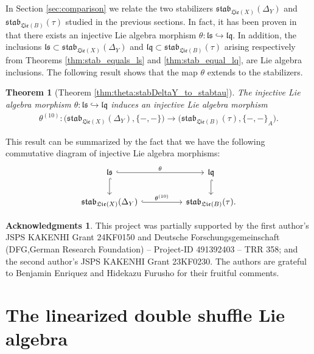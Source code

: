 \documentclass[11pt, a4paper]{amsart}
\newtheorem{thm}{Theorem}
\numberwithin{equation}{section}
\theoremstyle{definition}
\newtheorem*{acknowledgments}{Acknowledgments}
\newcommand{\ls}{\mathfrak{ls}}
\newcommand{\lqq}{\mathfrak{lq}}
\newcommand{\Lie}{\mathfrak{Lie}}
\newcommand{\stab}{\mathfrak{stab}}
\begin{document}
In Section \ref{sec:comparison} we relate the two stabilizers $\stab_{\Lie(X)}(\Delta_Y)$ and $\stab_{\Lie(B)}(\tau)$ studied in the previous sections. In fact, it has been proven in \cite[Theorem 7.10]{Bu25} that there exists an injective Lie algebra morphism $\theta : \ls \hookrightarrow \lqq$. In addition, the inclusions $\ls \subset \stab_{\Lie(X)}(\Delta_Y)$ and $\lqq \subset \stab_{\Lie(B)}(\tau)$ arising respectively from Theorems \ref{thm:stab_equals_ls} and \ref{thm:stab_equal_lq}, are Lie algebra inclusions. The following result shows that the map $\theta$ extends to the stabilizers.
\begin{thm}[Theorem \ref{thm:theta:stabDeltaY_to_stabtau}] The injective Lie algebra morphism $\theta : \ls \hookrightarrow \lqq$ induces an injective Lie algebra morphism
\begin{align*}
\theta^{(10)} : \big(\stab_{\Lie(X)}(\Delta_Y), \{-, -\}\big) \longrightarrow \big(\stab_{\Lie(B)}(\tau), \{-, -\}_A\big).
\end{align*}
\end{thm}
This result can be summarized by the fact that we have the following commutative diagram of injective Lie algebra morphisms:
\[\begin{tikzcd}
    \ls \ar[rr, hook, "\theta"] \ar[d, hook] && \lqq \ar[d, hook] \\
    \stab_{\Lie(X)}(\Delta_Y) \ar[rr, hook, "\theta^{(10)}"]&& \stab_{\Lie(B)}(\tau).
\end{tikzcd}\]
\vspace{0.3cm}
\begin{acknowledgments}
This project was partially supported by the first author's JSPS KAKENHI Grant 24KF0150 and Deutsche Forschungsgemeinschaft (DFG,German Research Foundation) – Project-ID 491392403 – TRR 358; and the second author's JSPS KAKENHI Grant 23KF0230. The authors are grateful to Benjamin Enriquez and Hidekazu Furusho for their fruitful comments.
\end{acknowledgments}

\section{The linearized double shuffle Lie algebra} \label{sec:ls}
\end{document}

